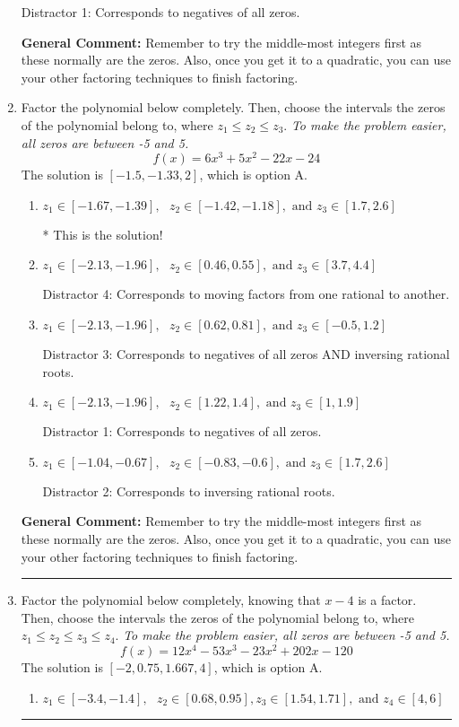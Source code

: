 \documentclass{extbook}[14pt]
\newcommand{\litem}[1]{\item #1

\rule{\textwidth}{0.4pt}}
\begin{document}
\begin{enumerate}
{\begin{enumerate}[label=\Alph*.]
 Distractor 1: Corresponds to negatives of all zeros.
\end{enumerate}

\textbf{General Comment:} Remember to try the middle-most integers first as these normally are the zeros. Also, once you get it to a quadratic, you can use your other factoring techniques to finish factoring.
}
\litem{
Factor the polynomial below completely. Then, choose the intervals the zeros of the polynomial belong to, where $z_1 \leq z_2 \leq z_3$. \textit{To make the problem easier, all zeros are between -5 and 5.}
\[ f(x) = 6x^{3} +5 x^{2} -22 x -24 \]The solution is \( [-1.5, -1.33, 2] \), which is option A.\begin{enumerate}[label=\Alph*.]
\item \( z_1 \in [-1.67, -1.39], \text{   }  z_2 \in [-1.42, -1.18], \text{   and   } z_3 \in [1.7, 2.6] \)

* This is the solution!
\item \( z_1 \in [-2.13, -1.96], \text{   }  z_2 \in [0.46, 0.55], \text{   and   } z_3 \in [3.7, 4.4] \)

 Distractor 4: Corresponds to moving factors from one rational to another.
\item \( z_1 \in [-2.13, -1.96], \text{   }  z_2 \in [0.62, 0.81], \text{   and   } z_3 \in [-0.5, 1.2] \)

 Distractor 3: Corresponds to negatives of all zeros AND inversing rational roots.
\item \( z_1 \in [-2.13, -1.96], \text{   }  z_2 \in [1.22, 1.4], \text{   and   } z_3 \in [1, 1.9] \)

 Distractor 1: Corresponds to negatives of all zeros.
\item \( z_1 \in [-1.04, -0.67], \text{   }  z_2 \in [-0.83, -0.6], \text{   and   } z_3 \in [1.7, 2.6] \)

 Distractor 2: Corresponds to inversing rational roots.
\end{enumerate}

\textbf{General Comment:} Remember to try the middle-most integers first as these normally are the zeros. Also, once you get it to a quadratic, you can use your other factoring techniques to finish factoring.
}
\litem{
Factor the polynomial below completely, knowing that $x -4$ is a factor. Then, choose the intervals the zeros of the polynomial belong to, where $z_1 \leq z_2 \leq z_3 \leq z_4$. \textit{To make the problem easier, all zeros are between -5 and 5.}
\[ f(x) = 12x^{4} -53 x^{3} -23 x^{2} +202 x -120 \]The solution is \( [-2, 0.75, 1.667, 4] \), which is option A.\begin{enumerate}[label=\Alph*.]
\item \( z_1 \in [-3.4, -1.4], \text{   }  z_2 \in [0.68, 0.95], z_3 \in [1.54, 1.71], \text{   and   } z_4 \in [4, 6] \)


\end{enumerate}}
\end{enumerate}
\end{document}
